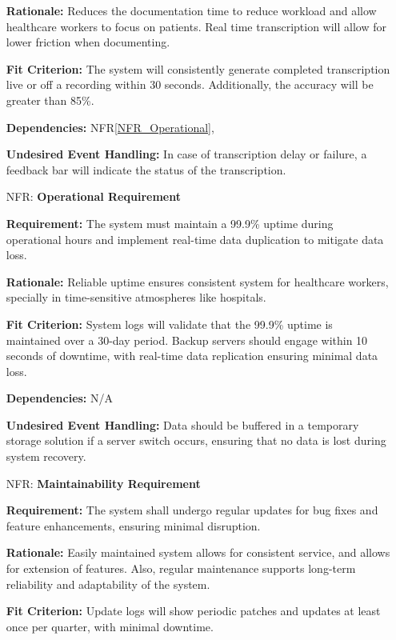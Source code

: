 \documentclass[12pt]{article}
\newcounter{nfrnum} %
\begin{document}
\begin{itemize}
    \textbf{Rationale:} Reduces the documentation time to reduce workload and allow healthcare workers to focus on patients. Real time transcription will allow for lower friction when documenting.
    
    \textbf{Fit Criterion:} The system will consistently generate completed transcription live or off a recording within 30 seconds. Additionally, the accuracy will be greater than 85\%.

    \textbf{Dependencies:} NFR\ref{NFR_Operational}, \label{FR_DictationRecording}

    \textbf{Undesired Event Handling:} In case of transcription delay or failure, a feedback bar will indicate the status of the transcription.

\item[NFR\refstepcounter{nfrnum}\thenfrnum \label{NFR_Operational}:] \textbf{Operational Requirement}

    \textbf{Requirement:} The system must maintain a 99.9\% uptime during operational hours and implement real-time data duplication to mitigate data loss.

    \textbf{Rationale:} Reliable uptime ensures consistent system for healthcare workers, specially in time-sensitive atmospheres like hospitals.

    \textbf{Fit Criterion:} System logs will validate that the 99.9\% uptime is maintained over a 30-day period. Backup servers should engage within 10 seconds of downtime, with real-time data replication ensuring minimal data loss. 

    \textbf{Dependencies:} N/A
    
    \textbf{Undesired Event Handling:} Data should be buffered in a temporary storage solution if a server switch occurs, ensuring that no data is lost during system recovery.

\item[NFR\refstepcounter{nfrnum}\thenfrnum \label{NFR_Maintainability}:] \textbf{Maintainability Requirement}

    \textbf{Requirement:} The system shall undergo regular updates for bug fixes and feature enhancements, ensuring minimal disruption.

    \textbf{Rationale:} Easily maintained system allows for consistent service, and allows for extension of features. Also, regular maintenance supports long-term reliability and adaptability of the system.

    \textbf{Fit Criterion:} Update logs will show periodic patches and updates at least once per quarter, with minimal downtime.


\end{itemize}
\end{document}
